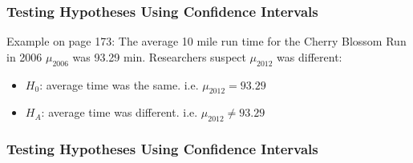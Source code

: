 \documentclass[handout]{beamer}
\newcommand{\blue}[1]{\textcolor{blue2}{#1}}
\newcommand{\xbar}{\overline{x}}
\begin{document}
\begin{frame}
\frametitle{Testing Hypotheses Using Confidence Intervals}
Example on page 173: The average 10 mile run time for the Cherry Blossom Run in 2006 $\mu_{2006}$ was 93.29 min.  Researchers suspect $\mu_{2012}$ was different:
\pause\begin{itemize}
\item $H_0$: average time was the same. i.e. $\mu_{2012} = 93.29$
\item $H_A$: average time was different. i.e. $\mu_{2012} \neq 93.29$
\end{itemize}

%
%
%
%
%

\end{frame}


\begin{frame}
\frametitle{Testing Hypotheses Using Confidence Intervals}

%
%
%
%

\end{frame}
\end{document}
